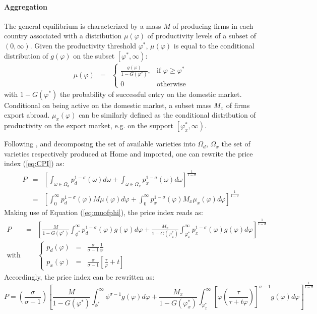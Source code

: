 \documentclass[a4paper,11pt]{article}
\begin{document}
\paragraph{Aggregation} The general equilibrium is characterized by a mass $M$ of producing firms in each country associated with a distribution $\mu(\varphi)$ of productivity levels of a subset of $\left(0,\infty\right)$. Given the productivity threshold $\varphi^\ast$, $\mu(\varphi)$ is equal to the conditional distribution of $g(\varphi)$ on the subset $\left[\varphi^\ast, \infty\right)$:
\begin{eqnarray}
\mu(\varphi) &=& \left\{
\begin{array}{ll}
\frac{g(\varphi)}{1-G(\varphi^\ast)}, & \text{if } \varphi\geq \varphi^\ast  \\
0 & \text{otherwise}
\end{array}
\right.  \label{eq:muofphi}
\end{eqnarray}
\noindent with $1-G(\varphi^\ast)$ the probability of successful entry on the domestic market. Conditional on being active on the domestic market, a subset mass $M_x$ of firms export abroad. $\mu_x(\varphi)$ can be similarly defined as the conditional distribution of productivity on the export market, e.g. on the support $\left[ \varphi^\ast_x,\infty\right)$.

Following \cite{melitz}, and decomposing the set of available varieties into $\Omega_d$, $\Omega_x$ the set of varieties respectively produced at Home and imported, one can rewrite the price index (\ref{eq:CPI}) as:
\begin{eqnarray*}
P &=& \left[\int_{\omega \in \Omega_d} p_d^{1-\sigma}(\omega)d\omega + \int_{\omega \in \Omega_x} p_x^{1-\sigma}(\omega)d\omega  \right]^{\frac{1}{1-\sigma}} \\
&=& \left[\int_{0}^\infty p_d^{1-\sigma}(\varphi)M\mu(\varphi)d\varphi + \int_{0}^\infty p_x^{1-\sigma}(\varphi)M_x \mu_x(\varphi)d\varphi  \right]^{\frac{1}{1-\sigma}}
\end{eqnarray*}
Making use of Equation (\ref{eq:muofphi}), the price index reads as:
\begin{eqnarray*}
P &=& \left[\frac{M}{1-G(\varphi^\ast)}\int_{\phi^\ast}^\infty p_d^{1-\sigma}(\varphi)g(\varphi)d\varphi + \frac{M_x}{1-G(\varphi_x^\ast)}\int_{\varphi^\ast_x}^\infty p_x^{1-\sigma}(\varphi)g(\varphi)d\varphi  \right]^{\frac{1}{1-\sigma}} \\
\text{with}&& \left\{
\begin{array}{lll}
p_d(\varphi)&=& \frac{\sigma}{\sigma-1} \frac{1}{\varphi}\\
p_x(\varphi)&=& \frac{\sigma}{\sigma-1} \left[\frac{\tau}{\varphi} +t\right]
\end{array}
\right.
\end{eqnarray*}
Accordingly, the price index can be rewritten as:
$$P = \left(\frac{\sigma}{\sigma-1}\right)\left[\frac{M}{1-G(\varphi^\ast)}\int_{\phi^\ast}^\infty \phi^{\sigma-1}g(\varphi)d\varphi + \frac{M_x}{1-G(\varphi_x^\ast)}\int_{\varphi^\ast_x}^\infty \left[\varphi \left(\frac{\tau}{\tau+t \varphi}  \right)  \right]^{\sigma-1}g(\varphi)d\varphi  \right]^{\frac{1}{1-\sigma}}$$
\end{document}
